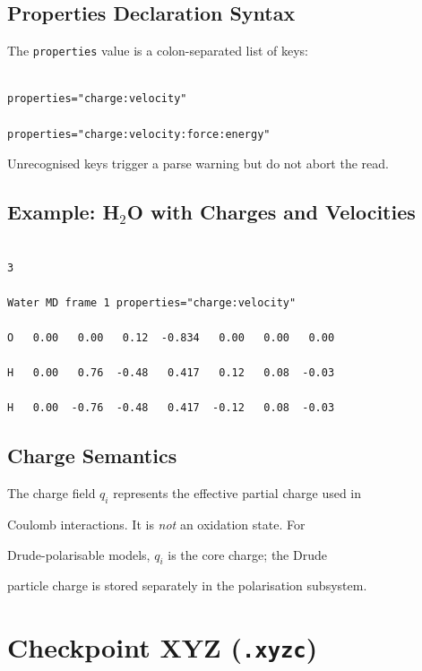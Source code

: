 \documentclass[12pt, a4paper, oneside]{article}
\begin{document}
\subsection{Properties Declaration Syntax}


The \texttt{properties} value is a colon-separated list of keys:


\begin{lstlisting}[language={},frame=single]

properties="charge:velocity"

properties="charge:velocity:force:energy"

\end{lstlisting}


Unrecognised keys trigger a parse warning but do not abort the read.


\subsection{Example: H\texorpdfstring{$_2$}{2}O with Charges and Velocities}


\begin{lstlisting}[language={},frame=single]

3

Water MD frame 1 properties="charge:velocity"

O   0.00   0.00   0.12  -0.834   0.00   0.00   0.00

H   0.00   0.76  -0.48   0.417   0.12   0.08  -0.03

H   0.00  -0.76  -0.48   0.417  -0.12   0.08  -0.03

\end{lstlisting}


\subsection{Charge Semantics}


The charge field $q_i$ represents the effective partial charge used in

Coulomb interactions.  It is \emph{not} an oxidation state.  For

Drude-polarisable models, $q_i$ is the core charge; the Drude

particle charge is stored separately in the polarisation subsystem.



\section{Checkpoint XYZ (\texttt{.xyzc})}
\end{document}
